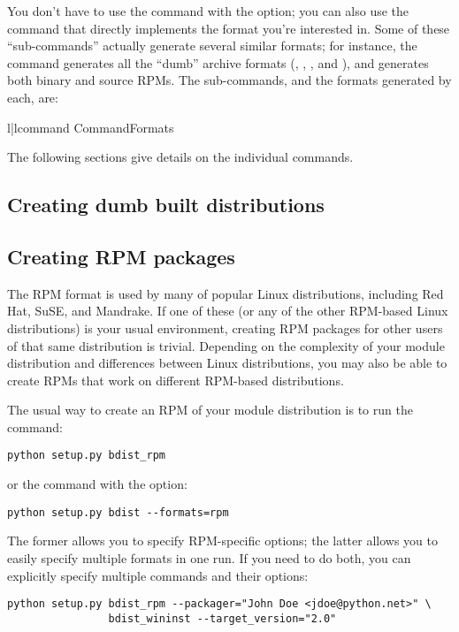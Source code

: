 \documentclass{howto}
\begin{document}
You don't have to use the  command with the
 option; you can also use the command that
directly implements the format you're interested in.  Some of these
 ``sub-commands'' actually generate several similar
formats; for instance, the  command generates all
the ``dumb'' archive formats (, , , and
), and  generates both binary and source
RPMs.  The  sub-commands, and the formats generated by
each, are:
\begin{tableii}{l|l}{command}%
  {Command}{Formats}
\end{tableii}

The following sections give details on the individual 
commands.


\subsection{Creating dumb built distributions}
\label{creating-dumb}



\subsection{Creating RPM packages}
\label{creating-rpms}

The RPM format is used by many of popular Linux distributions, including
Red Hat, SuSE, and Mandrake.  If one of these (or any of the other
RPM-based Linux distributions) is your usual environment, creating RPM
packages for other users of that same distribution is trivial.
Depending on the complexity of your module distribution and differences
between Linux distributions, you may also be able to create RPMs that
work on different RPM-based distributions.

The usual way to create an RPM of your module distribution is to run the 
 command:
\begin{verbatim}
python setup.py bdist_rpm
\end{verbatim}
or the  command with the  option:
\begin{verbatim}
python setup.py bdist --formats=rpm
\end{verbatim}
The former allows you to specify RPM-specific options; the latter allows 
you to easily specify multiple formats in one run.  If you need to do
both, you can explicitly specify multiple  commands
and their options:
\begin{verbatim}
python setup.py bdist_rpm --packager="John Doe <jdoe@python.net>" \
                bdist_wininst --target_version="2.0"
\end{verbatim}
\end{document}
